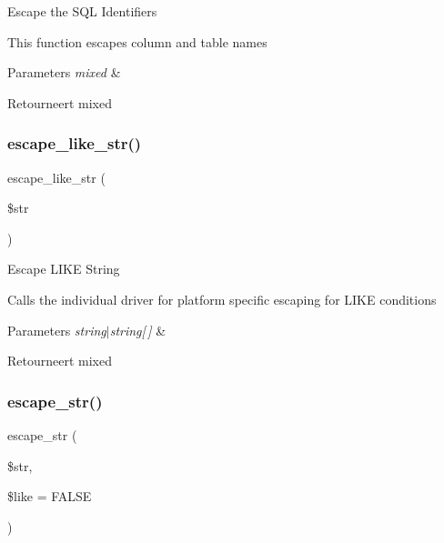 Escape the S\+QL Identifiers

This function escapes column and table names


\begin{DoxyParams}{Parameters}
{\em mixed} & \\
\hline
\end{DoxyParams}
\begin{DoxyReturn}{Retourneert}
mixed 
\end{DoxyReturn}
\mbox{\label{class_c_i___d_b__driver_a1a15f371afab8d5cfb35e38fc53c620f}} 
\subsubsection{\texorpdfstring{escape\_like\_str()}{escape\_like\_str()}}
{\footnotesize\ttfamily escape\+\_\+like\+\_\+str (\begin{DoxyParamCaption}\item[{}]{\$str }\end{DoxyParamCaption})}

Escape L\+I\+KE String

Calls the individual driver for platform specific escaping for L\+I\+KE conditions


\begin{DoxyParams}{Parameters}
{\em string$\vert$string\mbox{[}$\,$\mbox{]}} & \\
\hline
\end{DoxyParams}
\begin{DoxyReturn}{Retourneert}
mixed 
\end{DoxyReturn}
\mbox{\label{class_c_i___d_b__driver_aaba16891c8c93600a87075800cc5b72b}} 
\subsubsection{\texorpdfstring{escape\_str()}{escape\_str()}}
{\footnotesize\ttfamily escape\+\_\+str (\begin{DoxyParamCaption}\item[{}]{\$str,  }\item[{}]{\$like = {\ttfamily FALSE} }\end{DoxyParamCaption})}

